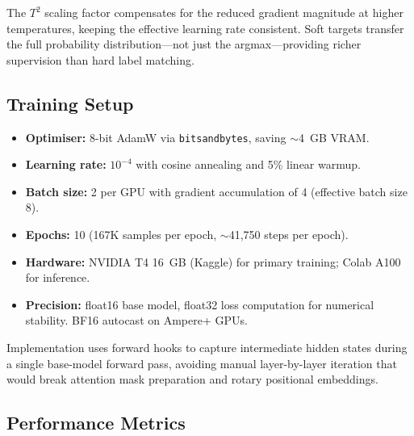 \documentclass[11pt]{article}
\begin{document}
The $T^2$ scaling factor \cite{hinton2015distilling} compensates for the reduced gradient magnitude at higher temperatures, keeping the effective learning rate consistent.  Soft targets transfer the full probability distribution—not just the argmax—providing richer supervision than hard label matching.

\subsection{Training Setup}

\begin{itemize}
    \item \textbf{Optimiser:} 8-bit AdamW \cite{loshchilov2019adamw} via \texttt{bitsandbytes}, saving $\sim$4~GB VRAM.
    \item \textbf{Learning rate:} $10^{-4}$ with cosine annealing and 5\% linear warmup.
    \item \textbf{Batch size:} 2 per GPU with gradient accumulation of 4 (effective batch size 8).
    \item \textbf{Epochs:} 10 (167K samples per epoch, $\sim$41{,}750 steps per epoch).
    \item \textbf{Hardware:} NVIDIA T4 16~GB (Kaggle) for primary training; Colab A100 for inference.
    \item \textbf{Precision:} float16 base model, float32 loss computation for numerical stability.  BF16 autocast on Ampere+ GPUs.
\end{itemize}

Implementation uses forward hooks to capture intermediate hidden states during a single base-model forward pass, avoiding manual layer-by-layer iteration that would break attention mask preparation and rotary positional embeddings.

\subsection{Performance Metrics}
\label{sec:performance_metrics}
\end{document}
